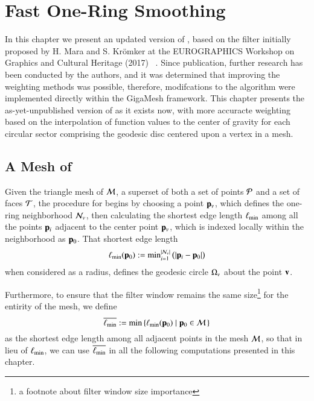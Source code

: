 \chapter{Fast One-Ring Smoothing}
\label{ch4}
In this chapter we present an updated version of , based on the filter initially proposed by H. Mara and S. Krömker at the EUROGRAPHICS Workshop on Graphics and Cultural Heritage (2017) ~\cite[s.~3.2]{Mara17}. Since publication, further research has been conducted by the authors, and it was determined that improving the weighting methods was possible, therefore, modifcations to the algorithm were implemented directly within the GigaMesh  framework. This chapter presents the as-yet-unpublished version of  as it exists now, with more accuracte weighting based on the interpolation of function values to the center of gravity for each circular sector comprising the geodesic disc centered upon a vertex in a mesh.

%
%
%
%
\section{A Mesh of \tdd{}}
\label{ch4sPE}
Given the triangle mesh of \tdd{} $\mathcal{M}$, a superset of both a set of points $\mathcal{P}$ and a set of faces $\mathcal{T}$, the procedure for   begins by choosing a point $\mathbf{p}_v$, which defines the one-ring neighborhood $\mathcal{N}_v$, then calculating the shortest edge length $\ell_\text{min}$ among all the points $\mathbf{p}_i$ adjacent to the center point $\mathbf{p}_v$, which  is indexed locally within the neighborhood as $\mathbf{p}_0$. That shortest edge length
%
\begin{equation}
	\ell_\text{min}(\mathbf{p}_0) := \text{min}^{|\mathcal{N}_v|}_{i=1}\,\big(|\mathbf{p}_i - \mathbf{p}_0|\big)
	\label{eq:localMinimumEdgeLength}
\end{equation}%
%
%
%
when considered as a radius, defines the geodesic circle $\Omega_v$ about the point $\mathbf{v}$.

Furthermore, to ensure that the filter window remains the same size\footnote{a footnote about filter window size importance} for the entirity of the mesh, we define
%
\begin{equation}
	\overline{\ell_\text{min}} := \min\left \{\ell_\text{min}(\mathbf{p}_0) \;|\; \mathbf{p}_0 \in \mathcal{M}\,\right \}
	\label{eq:globalMinimumEdgeLength}
\end{equation}%
%
%   
as the shortest edge length among all adjacent points in the mesh $\mathcal{M}$, so that in lieu of $\ell_\text{min}$, we can use $\overline{\ell_\text{min}}$ in all the following computations presented in this chapter.

